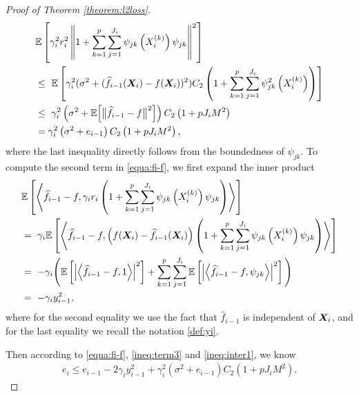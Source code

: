 \begin{proof}[Proof of Theorem \ref{theorem:l2loss}]
\begin{align}
    &\mathbb{E} \left[\gamma_i^2r_i^2\left\|1+\sum_{k=1}^p\sum_{j=1}^{J_i}\psi_{jk}\left(X_i^{(k)}\right)\psi_{jk}\right\|^2\right]\notag\\
    &\leq~ \mathbb{E} \left[\gamma_i^2(\sigma^2 + (\widehat{f}_{i-1}(\boldsymbol{X}_i) - f(\boldsymbol{X}_i) )^2) C_2\left(1+\sum_{k=1}^p\sum_{j=1}^{J_i}\psi_{jk}^2\left(X_i^{(k)}\right)\right)\right] \notag\\
    &\leq~ \gamma_i^2\left(\sigma^2 + \mathbb{E} \Big[\big\|\widehat{f}_{i-1}-f\big\|^2\Big]\right)C_2\left(1+pJ_i M^2\right)\\
    &= \gamma_i^2\left(\sigma^2 + e_{i-1}\right)C_2\left(1+pJ_i M^2\right)
    , \label{ineq:term3}
\end{align}
where the last inequality directly follows from the boundedness of $\psi_{jk}$. 
To compute the second term in \eqref{equa:fi-f}, we first expand the inner product
\begin{align}
    &\mathbb{E}\left[\left\langle \widehat{f}_{i-1}-f,\gamma_ir_i \left(1+\sum_{k=1}^p\sum_{j=1}^{J_i}\psi_{jk}\left(X_i^{(k)}\right)\psi_{jk}\right) \right\rangle\right]\notag\\
    &=~\gamma_i \mathbb{E} \left[\left\langle \widehat{f}_{i-1}-f,\left(f(\boldsymbol{X}_i) - \widehat{f}_{i-1}(\boldsymbol{X}_i)\right)\left(1+\sum_{k=1}^p\sum_{j=1}^{J_i}\psi_{jk}\left(X_i^{(k)}\right)\psi_{jk}\right) \right\rangle\right] \notag \\
&=~-\gamma_i\Bigg(\mathbb{E}\left[\left|\left\langle \widehat{f}_{i-1}-f,1 \right\rangle\right|^2\right]+\sum_{k=1}^p\sum_{j=1}^{J_i}\mathbb{E}\left[\left|\left\langle \widehat{f}_{i-1}-f,\psi_{jk} \right\rangle\right|^2\right]\Bigg)\\
&=~-\gamma_i y_{i-1}^2, \label{ineq:inter1}
\end{align}
where for the second equality we use the fact that $\hat f_{i-1}$ is independent of $\bm{X}_i$, and for the last equality we recall the notation \eqref{def:yi}.

Then according to \eqref{equa:fi-f}, \eqref{ineq:term3} and \eqref{ineq:inter1}, we know
\begin{align}
    e_i \leq e_{i-1} - 2\gamma_iy_{i-1}^2 + \gamma_i^2\left(\sigma^2 + e_{i-1}\right)C_2\left(1+pJ_i M^2\right). \label{ineq:general_recursion}
\end{align}


\end{proof}
